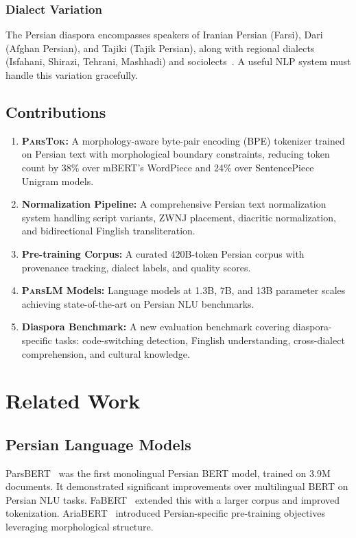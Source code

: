 \documentclass[11pt,a4paper]{article}
\newcommand{\parslm}{\textsc{ParsLM}\xspace}
\newcommand{\parstok}{\textsc{ParsTok}\xspace}
\begin{document}
\subsubsection{Dialect Variation}

The Persian diaspora encompasses speakers of Iranian Persian (Farsi), Dari (Afghan Persian), and Tajiki (Tajik Persian), along with regional dialects (Isfahani, Shirazi, Tehrani, Mashhadi) and sociolects~\citep{windfuhr2009iranian}. A useful NLP system must handle this variation gracefully.

\subsection{Contributions}

\begin{enumerate}[label=(\roman*)]
    \item \textbf{\parstok:} A morphology-aware byte-pair encoding (BPE) tokenizer trained on Persian text with morphological boundary constraints, reducing token count by 38\% over mBERT's WordPiece and 24\% over SentencePiece Unigram models.
    \item \textbf{Normalization Pipeline:} A comprehensive Persian text normalization system handling script variants, ZWNJ placement, diacritic normalization, and bidirectional Finglish transliteration.
    \item \textbf{Pre-training Corpus:} A curated 420B-token Persian corpus with provenance tracking, dialect labels, and quality scores.
    \item \textbf{\parslm Models:} Language models at 1.3B, 7B, and 13B parameter scales achieving state-of-the-art on Persian NLU benchmarks.
    \item \textbf{Diaspora Benchmark:} A new evaluation benchmark covering diaspora-specific tasks: code-switching detection, Finglish understanding, cross-dialect comprehension, and cultural knowledge.
\end{enumerate}

\section{Related Work}

\subsection{Persian Language Models}

ParsBERT~\citep{shafiee2021parsbert} was the first monolingual Persian BERT model, trained on 3.9M documents. It demonstrated significant improvements over multilingual BERT on Persian NLU tasks. FaBERT~\citep{fabert2022} extended this with a larger corpus and improved tokenization. AriaBERT~\citep{ghafouri2023ariabert} introduced Persian-specific pre-training objectives leveraging morphological structure.
\end{document}
